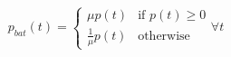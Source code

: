 \begin{equation}
	p_{bat}(t) =
	\begin{cases}
		\mu p(t) &\text{if } p(t) \geq 0\\
		\frac{1}{\mu}p(t) &\text{otherwise}
	\end{cases}
	\forall t
	\label{ch2:equ:battery-power}
\end{equation}